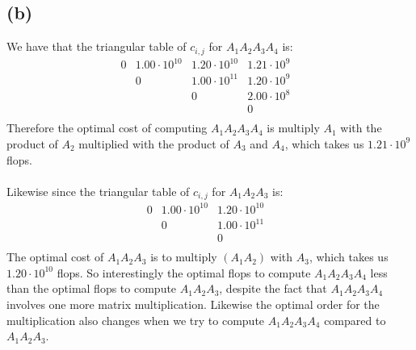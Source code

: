 \subsection*{(b)}
We have that the triangular table of $c_{i,j}$ for $A_1A_2A_3A_4$ is:
$$\begin{matrix}
    0&1.00\cdot 10^{10}&1.20\cdot 10^{10}&1.21\cdot 10^{9}&\\
    & 0&1.00\cdot 10^{11}&1.20\cdot 10^{9}&\\
    & & 0&2.00\cdot 10^{8}&\\
    & & & 0&\\
    \end{matrix}$$
Therefore the optimal cost of computing $A_1A_2A_3A_4$ 
is multiply $A_1$ with the product of $A_2$ multiplied with the product of $A_3$ and $A_4$, 
which takes us $\boxed{1.21\cdot 10^9}$ flops.
\\\\
Likewise since the triangular table of $c_{i,j}$ for $A_1A_2A_3$ is:
$$\begin{matrix}
    0&1.00\cdot 10^{10}&1.20\cdot 10^{10}&\\
    & 0&1.00\cdot 10^{11}&\\
    & & 0&\\
    \end{matrix}$$
The optimal cost of $A_1A_2A_3$ is to multiply $(A_1A_2)$ with $A_3$, 
which takes us $1.20\cdot 10^{10}$ flops. So interestingly the optimal flops
to compute $A_1A_2A_3A_4$ less than the optimal flops to compute $A_1A_2A_3$, 
despite the fact that $A_1A_2A_3A_4$ involves one more matrix multiplication. Likewise the
optimal order for the multiplication also changes when we try to compute $A_1A_2A_3A_4$ compared to $A_1A_2A_3$.





